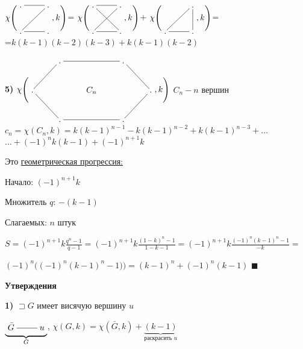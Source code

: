 \documentclass[a4paper, 12pt] {article}
\begin{document}
$ \chi \Bigg( \begin{matrix}
	\xymatrix{
		. \ar@{-}[r]& . \ar@{-}[ld] \\
		. \ar@{-}[r]& . \\
	}
\end{matrix}, k \Bigg)$=
$ \chi \Bigg( \begin{matrix}
	\xymatrix{
		. \ar@{-}[r] \ar@{-}[rd]& . \ar@{-}[ld] \\
		. \ar@{-}[r]& . \\
	}
\end{matrix}, k \Bigg)$+
$ \chi \Bigg( \begin{matrix}
	\xymatrix{
		& . \ar@{-}[ld] \ar@{-}[d]\\
		. \ar@{-}[r]& . \\
	}
\end{matrix}, k \Bigg)$=\\

=$ k(k-1)(k-2)(k-3)  + k(k-1)(k-2)$

\textbf{5)} 
$ \chi \Bigg( \begin{matrix}
	\xymatrix{
		& . \ar@{-}[rr] \ar@{-}[ld]& & . \ar@{-}[rd] \\
		.\ar@{-}[rd] & & C_{n} & & .\ar@{-}[ld] \\
		& . \ar@{-}[rr]& & .  \\
	}
\end{matrix}, k \Bigg)$ $ C_{n} - n \text{ вершин} $\\

$ c_{n} = \chi ( C_{n}, k)= k(k-1)^{n-1}-k(k-1)^{n-2}+k(k-1)^{n-3}+\dots$ \\
 $\dots + (-1)^{n}k(k-1) +(-1)^{n+1}k$
 
 Это \underline{геометрическая прогрессия:}
 
 Начало: $ (-1)^{n+1}k $
 
 Множитель $ q $: $ -(k-1) $
 
 Слагаемых: $ n $ штук

$ S =  (-1)^{n+1}k \frac{q^{n}-1} {q-1}= (-1)^{n+1}k \frac{(1-k)^{n}-1} {1-k-1}=(-1)^{n+1}k \frac{(-1)^{n}(k-1)^{n}-1} {-k}=$ 

 $(-1)^{n} \Big((-1)^{n}(k-1)^{n}-1)\Big)=(k-1)^{n}+(-1)^{n}(k-1)$ $ \blacksquare $
 
\textbf{ Утверждения} 

\textbf{1)} $  \sqsupset G $ имеет висячую вершину $ u $ 

$ \underbrace{\begin{matrix}
	\xymatrix{
		\bar G \ar@{-}[r]& u \\
	}
\end{matrix}}_{G}$, $ \chi (G, k) = \chi (\bar G, k) +\underbrace{(k-1)}_{\text{раскрасить } u} $
\end{document}
